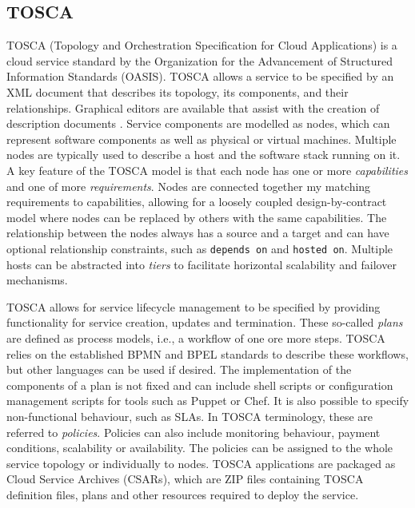 \documentclass[10pt, conference, compsocconf]{IEEEtran}
\begin{document}
\subsection{TOSCA}

TOSCA (Topology and Orchestration Specification for Cloud Applications) \cite{binz2012portable} is a cloud service standard by the Organization for the Advancement of Structured Information Standards (OASIS). TOSCA allows a service to be specified by an XML document that describes its topology, its components, and their relationships. Graphical editors are available that assist with the creation of description documents \cite{kopp2013winery}. Service components are modelled as nodes, which can represent software components as well as physical or virtual machines. Multiple nodes are typically used to describe a host and the software stack running on it. A key feature of the TOSCA model is that each node has one or more \textit{capabilities} and one of more \textit{requirements}. Nodes are connected together my matching requirements to capabilities, allowing for a loosely coupled design-by-contract model where nodes can be replaced by others with the same capabilities. The relationship between the nodes always has a source and a target and can have optional relationship constraints, such as \texttt{depends on} and \texttt{hosted on}. Multiple hosts can be abstracted into \textit{tiers} to facilitate horizontal scalability and failover mechanisms.

TOSCA allows for service lifecycle management to be specified by providing functionality for service creation, updates and termination. These so-called \textit{plans} are defined as process models, i.e., a workflow of one ore more steps. TOSCA relies on the established BPMN and BPEL standards to describe these workflows, but other languages can be used if desired. The implementation of the components of a plan is not fixed and can include shell scripts or configuration management scripts for tools such as Puppet or Chef. It is also possible to specify non-functional behaviour, such as SLAs. In TOSCA terminology, these are referred to \textit{policies}. Policies can also include monitoring behaviour, payment conditions, scalability or availability. The policies can be assigned to the whole service topology or individually to nodes. TOSCA applications are packaged as Cloud Service Archives (CSARs), which are ZIP files containing TOSCA definition files, plans and other resources required to deploy the service.
\end{document}
